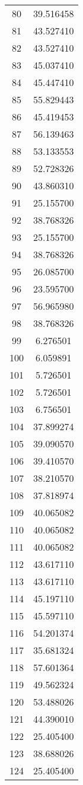 \documentclass[12pt]{article}
\begin{document}
\begin{longtable}{@{}cc@{}}
80 & 39.516458 \\
81 & 43.527410 \\
82 & 43.527410 \\
83 & 45.037410 \\
84 & 45.447410 \\
85 & 55.829443 \\
86 & 45.419453 \\
87 & 56.139463 \\
88 & 53.133553 \\
89 & 52.728326 \\
90 & 43.860310 \\
91 & 25.155700 \\
92 & 38.768326 \\
93 & 25.155700 \\
94 & 38.768326 \\
95 & 26.085700 \\
96 & 23.595700 \\
97 & 56.965980 \\
98 & 38.768326 \\
99 & 6.276501 \\
100 & 6.059891 \\
101 & 5.726501 \\
102 & 5.726501 \\
103 & 6.756501 \\
104 & 37.899274 \\
105 & 39.090570 \\
106 & 39.410570 \\
107 & 38.210570 \\
108 & 37.818974 \\
109 & 40.065082 \\
110 & 40.065082 \\
111 & 40.065082 \\
112 & 43.617110 \\
113 & 43.617110 \\
114 & 45.197110 \\
115 & 45.597110 \\
116 & 54.201374 \\
117 & 35.681324 \\
118 & 57.601364 \\
119 & 49.562324 \\
120 & 53.488026 \\
121 & 44.390010 \\
122 & 25.405400 \\
123 & 38.688026 \\
124 & 25.405400 \\

\end{longtable}
\end{document}
